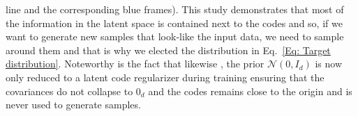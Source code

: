 \documentclass[10pt,journal,compsoc]{IEEEtran}
\begin{document}
line and the corresponding blue frames). This study demonstrates that most of the information in the latent space is contained next to the codes and so, if we want to generate new samples that look-like the input data, we need to sample around them and that is why we elected the distribution in Eq.~\eqref{Eq: Target distribution}. 
    Noteworthy is the fact that  likewise \cite{ghosh_variational_2020}, the prior $\mathcal{N}(0, I_d)$ is now only reduced to a latent code regularizer during training ensuring that the covariances do not collapse to $0_d$ and the codes remains close to the origin and is never used to generate samples.
      
\end{document}
